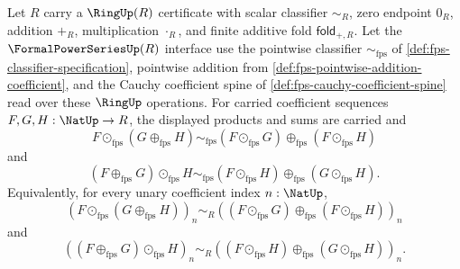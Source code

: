 \begin{theorem}
\label{thm:fps-cauchy-product-distributes-over-fps-addition}
Let $R$ carry a $\RingUp(R)$ certificate with scalar classifier $\sim_R$, zero endpoint $0_R$, addition $+_R$, multiplication $\cdot_R$, and finite additive fold $\mathsf{fold}_{+,R}$. Let the $\FormalPowerSeriesUp(R)$ interface use the pointwise classifier $\sim_{\mathrm{fps}}$ of \autoref{def:fps-classifier-specification}, pointwise addition from \autoref{def:fps-pointwise-addition-coefficient}, and the Cauchy coefficient spine of \autoref{def:fps-cauchy-coefficient-spine} read over these $\RingUp$ operations. For carried coefficient sequences $F,G,H:\NatUp\to R$, the displayed products and sums are carried and
$$
F\odot_{\mathrm{fps}}(G\oplus_{\mathrm{fps}}H)
\sim_{\mathrm{fps}}
(F\odot_{\mathrm{fps}}G)\oplus_{\mathrm{fps}}(F\odot_{\mathrm{fps}}H)
$$
and
$$
(F\oplus_{\mathrm{fps}}G)\odot_{\mathrm{fps}}H
\sim_{\mathrm{fps}}
(F\odot_{\mathrm{fps}}H)\oplus_{\mathrm{fps}}(G\odot_{\mathrm{fps}}H).
$$
Equivalently, for every unary coefficient index $n:\NatUp$,
$$
(F\odot_{\mathrm{fps}}(G\oplus_{\mathrm{fps}}H))_n
\sim_R
((F\odot_{\mathrm{fps}}G)\oplus_{\mathrm{fps}}(F\odot_{\mathrm{fps}}H))_n
$$
and
$$
((F\oplus_{\mathrm{fps}}G)\odot_{\mathrm{fps}}H)_n
\sim_R
((F\odot_{\mathrm{fps}}H)\oplus_{\mathrm{fps}}(G\odot_{\mathrm{fps}}H))_n.
$$
\end{theorem}
